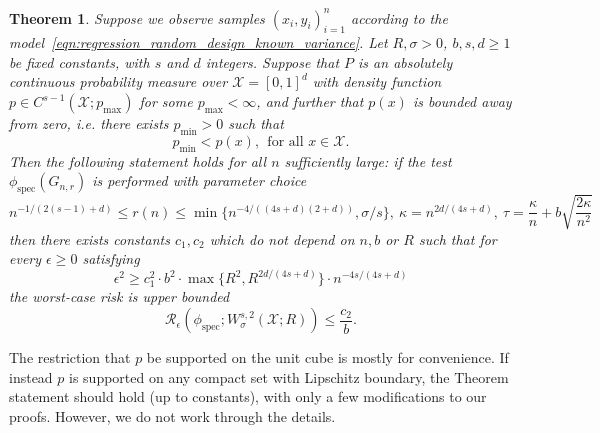 \documentclass{article}
\newcommand{\1}{\mathbf{1}}
\newcommand{\Xset}{\mathcal{X}}
\newcommand{\spec}{\mathrm{spec}}
\theoremstyle{alden}
\theoremstyle{aldenthm}
\newtheorem{theorem}{Theorem}
\theoremstyle{definition}
\theoremstyle{remark}
\begin{document}
\begin{theorem}
	\label{thm:sobolev_testing_rate}
	Suppose we observe samples $(x_i,y_i)_{i = 1}^{n}$ according to the model~\eqref{eqn:regression_random_design_known_variance}. Let $R,\sigma > 0$, $b,s,d \geq 1$ be fixed constants, with $s$ and $d$ integers. Suppose that $P$ is an absolutely continuous probability measure over $\mathcal{X} = [0,1]^d$ with density function $p \in C^{s-1}(\Xset;p_{\max})$ for some $p_{\max} < \infty$, and further that $p(x)$ is bounded away from zero, i.e. there exists $p_{\min} > 0$ such that 
	\begin{equation*}
	p_{\min} < p(x),~~ \textrm{for all $x \in \mathcal{X}$.}
	\end{equation*}
	Then the following statement holds for all $n$ sufficiently large: if the test $\phi_{\spec}(G_{n,r})$ is performed with parameter choice
	\begin{equation*}
	n^{-1/(2(s-1) + d)} \leq r(n) \leq \min\bigl\{n^{-4/((4s + d)(2+d))},\sigma/s\bigr\}, ~\kappa = n^{2d/(4s + d)}, ~\tau = \frac{\kappa}{n} + b\sqrt{\frac{2\kappa}{n^2}}
	\end{equation*}
	then there exists constants $c_1,c_2$ which do not depend on $n,b$ or $R$ such that for every $\epsilon \geq 0$ satisfying
	\begin{equation}
	\label{eqn:sobolev_testing_rate}
	\epsilon^2 \geq c_1^2 \cdot b^2 \cdot \max\{R^2,R^{2d/(4s + d)}\} \cdot n^{-{4s}/(4s + d)}
	\end{equation}
	the worst-case risk is upper bounded
	\begin{equation}
	\label{eqn:sobolev_testing_rate_1}
	\mathcal{R}_{\epsilon}(\phi_{\mathrm{spec}}; W_{\sigma}^{s,2}(\mathcal{X};R)) \leq \frac{c_2}{b}.
	\end{equation}
\end{theorem}

The restriction that $p$ be supported on the unit cube is mostly for convenience. If instead $p$ is supported on any compact set with Lipschitz boundary, the Theorem statement should hold (up to constants), with only a few modifications to our proofs. However, we do not work through the details.
\end{document}
